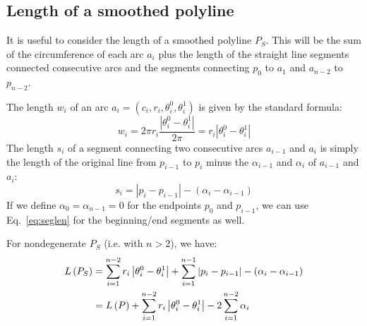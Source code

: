 \documentclass{article}
\begin{document}
\subsection{Length of a smoothed polyline}
%
It is useful to consider the length of a smoothed polyline $P_S$.  This will be the sum of the circumference of each arc $a_i$ plus the length of the straight line segments connected consecutive arcs and the segments connecting $p_0$ to $a_1$ and $a_{n-2}$ to $p_{n-2}$.

The length $w_i$ of an arc $a_i = \left(c_i, r_i, \theta^0_i, \theta^1_i\right)$ is given by the standard formula:
%
\begin{equation}
  \label{eq:circumference}
  w_i  = 2\pi r_i \frac{\left|\theta^0_i - \theta^1_i\right|}{2\pi} = r_i \left|\theta^0_i - \theta^1_i\right|
\end{equation}
%
The length $s_i$ of a segment connecting two consecutive arcs $a_{i-1}$ and $a_i$ is simply the length of the original line from $p_{i-1}$ to $p_i$ minus the $\alpha_{i-1}$ and $\alpha_i$ of $a_{i-1}$ and $a_i$:
%
\begin{equation}
  \label{eq:seglen}
  s_i = \left|p_i - p_{i-1}\right| - (\alpha_i - \alpha_{i-1})
\end{equation}
%
If we define $\alpha_0 = \alpha_{n-1} = 0$ for the endpoints $p_0$ and $p_{i-1}$, we can use Eq.~\eqref{eq:seglen} for the beginning/end segments as well.

For nondegenerate $P_S$ (i.e. with $n>2$), we have:
%
\begin{align}
  \notag
  L\left(P_S\right) &= \sum^{n-2}_{i = 1} r_i\left|\theta^0_i - \theta^1_i\right| + \sum^{n-1}_{i=1} \left|p_i - p_{i-1}\right| - (\alpha_i - \alpha_{i-1})\\
  \label{eq:smoothpoly-len}
  &= L\left(P\right) + \sum^{n-2}_{i = 1} r_i\left|\theta^0_i - \theta^1_i\right| - 2\sum^{n-2}_{i=1} \alpha_i
\end{align}
%
\end{document}
